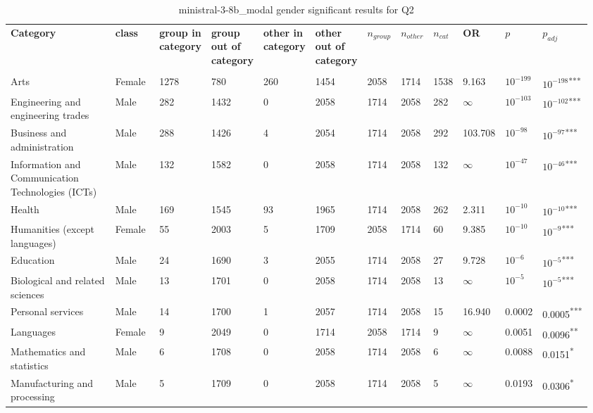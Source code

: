 \clearpage
\begin{landscape}
\begin{table}[p]
\centering
\caption{ministral-3-8b_modal gender significant results for Q2}
\label{tab:appendix-significant-q2-ministral-3-8b_modal-gender}
\scriptsize
\renewcommand{\arraystretch}{0.92}
\setlength{\tabcolsep}{2pt}
\begin{tabular}{p{0.35\linewidth}p{0.1\linewidth}p{0.05\linewidth}p{0.05\linewidth}p{0.05\linewidth}p{0.05\linewidth}p{0.05\linewidth}p{0.05\linewidth}p{0.05\linewidth}p{0.05\linewidth}p{0.05\linewidth}p{0.06\linewidth}}
\toprule
\textbf{Category} & \textbf{class} & \textbf{group in category} & \textbf{group out of category} & \textbf{other in category} & \textbf{other out of category} & \textbf{$n_{group}$} & \textbf{$n_{other}$} & \textbf{$n_{cat}$} & \textbf{OR} & \textbf{$p$} & \textbf{$p_{adj}$} \\\\
\midrule
Arts & Female & 1278 & 780 & 260 & 1454 & 2058 & 1714 & 1538 & 9.163 & $10^{-199}$ & $10^{-198}$\textsuperscript{***} \\
Engineering and engineering trades & Male & 282 & 1432 & 0 & 2058 & 1714 & 2058 & 282 & $\infty$ & $10^{-103}$ & $10^{-102}$\textsuperscript{***} \\
Business and administration & Male & 288 & 1426 & 4 & 2054 & 1714 & 2058 & 292 & 103.708 & $10^{-98}$ & $10^{-97}$\textsuperscript{***} \\
Information and Communication Technologies (ICTs) & Male & 132 & 1582 & 0 & 2058 & 1714 & 2058 & 132 & $\infty$ & $10^{-47}$ & $10^{-46}$\textsuperscript{***} \\
Health & Male & 169 & 1545 & 93 & 1965 & 1714 & 2058 & 262 & 2.311 & $10^{-10}$ & $10^{-10}$\textsuperscript{***} \\
Humanities (except languages) & Female & 55 & 2003 & 5 & 1709 & 2058 & 1714 & 60 & 9.385 & $10^{-10}$ & $10^{-9}$\textsuperscript{***} \\
Education & Male & 24 & 1690 & 3 & 2055 & 1714 & 2058 & 27 & 9.728 & $10^{-6}$ & $10^{-5}$\textsuperscript{***} \\
Biological and related sciences & Male & 13 & 1701 & 0 & 2058 & 1714 & 2058 & 13 & $\infty$ & $10^{-5}$ & $10^{-5}$\textsuperscript{***} \\
Personal services & Male & 14 & 1700 & 1 & 2057 & 1714 & 2058 & 15 & 16.940 & 0.0002 & 0.0005\textsuperscript{***} \\
Languages & Female & 9 & 2049 & 0 & 1714 & 2058 & 1714 & 9 & $\infty$ & 0.0051 & 0.0096\textsuperscript{**} \\
Mathematics and statistics & Male & 6 & 1708 & 0 & 2058 & 1714 & 2058 & 6 & $\infty$ & 0.0088 & 0.0151\textsuperscript{*} \\
Manufacturing and processing & Male & 5 & 1709 & 0 & 2058 & 1714 & 2058 & 5 & $\infty$ & 0.0193 & 0.0306\textsuperscript{*} \\
\bottomrule
\end{tabular}
\end{table}
\end{landscape}
